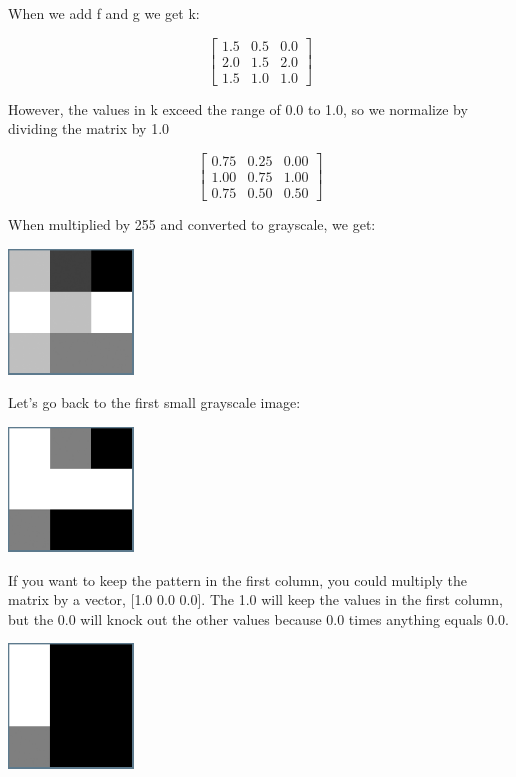 When we add f and g we get k:

$$\begin{bmatrix}
1.5 & 0.5 & 0.0\\
2.0 & 1.5 & 2.0\\
1.5 & 1.0 & 1.0 
\end{bmatrix}$$

However, the values in k exceed the range of 0.0 to 1.0, so we normalize by dividing the matrix by 1.0

$$\begin{bmatrix}
0.75 & 0.25 & 0.00\\
1.00 & 0.75 & 1.00\\
0.75 & 0.50 & 0.50  
\end{bmatrix}$$

When multiplied by 255 and converted to grayscale, we get:

\includegraphics[width=0.25\textwidth]{fgBitmapAdded.png}

Let's go back to the first small grayscale image:

\includegraphics[width=0.25\textwidth]{fBitmap.png}

If you want to keep the pattern in the first column, you could multiply the matrix by a vector, [1.0 0.0 0.0]. The 1.0 will keep the values in the first column, but the 0.0 will knock out the other values because 0.0 times anything equals 0.0.

\includegraphics[width=0.25\textwidth]{onechannel.png}


